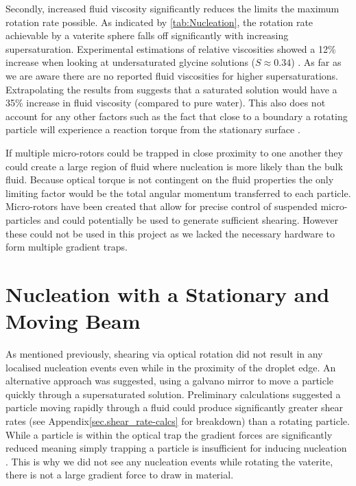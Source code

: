 Secondly, increased fluid viscosity significantly reduces 
the limits the maximum rotation rate possible. As indicated 
by \ref{tab:Nucleation}, the rotation rate achievable by a
vaterite sphere falls off significantly with increasing 
supersaturation. Experimental estimations of relative viscosities
showed a 12\% increase when looking at undersaturated glycine
solutions ($S\approx0.34$) \cite{Patyar2020}. As far as we
are aware there are no reported fluid viscosities for higher
supersaturations. Extrapolating the results from \cite{Patyar2020}
suggests that a saturated solution would have a 35\% increase 
in fluid viscosity (compared to pure water). This also does 
not account for any other factors such as the fact that close
to a boundary a rotating particle will experience a reaction
torque from the stationary surface \cite{Bruce2020}. 

If multiple micro-rotors could be trapped in close proximity 
to one another they could create a large region of fluid where 
nucleation is more likely than the bulk fluid. Because optical
torque is not contingent on the fluid properties the only 
limiting factor would be the total angular momentum transferred 
to each particle. Micro-rotors have been created that allow for 
precise control of suspended micro-particles \cite{Butaite2019} 
and could potentially be used to generate sufficient shearing. 
However these could not be used in this project as we lacked the 
necessary hardware to form multiple gradient traps.  
\section{Nucleation with a Stationary and Moving Beam}
As mentioned previously, shearing via optical rotation did 
not result in any localised nucleation events even while 
in the proximity of the droplet edge. An alternative approach
was suggested, using a galvano mirror to move a particle 
quickly through a supersaturated solution. Preliminary 
calculations suggested a particle moving rapidly through 
a fluid could produce significantly greater shear rates 
(see Appendix\ref{sec.shear_rate-calcs} for breakdown) 
than a rotating particle. While a particle is within the 
optical trap the gradient forces are significantly reduced 
meaning simply trapping a particle is insufficient for 
inducing nucleation \cite{Flannigan2023}. This is why we did 
not see any nucleation events while rotating the vaterite, 
there is not a large gradient force to draw in material. 

